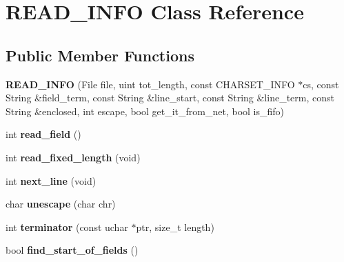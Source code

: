 \hypertarget{classREAD__INFO}{}\section{R\+E\+A\+D\+\_\+\+I\+N\+FO Class Reference}
\label{classREAD__INFO}
\subsection*{Public Member Functions}
\begin{DoxyCompactItemize}
\item 
\mbox{\label{classREAD__INFO_aa0caabe4e1c80794d24a5b05553e6c41}} 
{\bfseries R\+E\+A\+D\+\_\+\+I\+N\+FO} (File file, uint tot\+\_\+length, const C\+H\+A\+R\+S\+E\+T\+\_\+\+I\+N\+FO $\ast$cs, const String \&field\+\_\+term, const String \&line\+\_\+start, const String \&line\+\_\+term, const String \&enclosed, int escape, bool get\+\_\+it\+\_\+from\+\_\+net, bool is\+\_\+fifo)
\item 
\mbox{\label{classREAD__INFO_a0faa1f32582473e54869a49d8c17f079}} 
int {\bfseries read\+\_\+field} ()
\item 
\mbox{\label{classREAD__INFO_ab404e9e75fab6664e0985a0092120850}} 
int {\bfseries read\+\_\+fixed\+\_\+length} (void)
\item 
\mbox{\label{classREAD__INFO_a74a1cf8c13f4884c2ad902402ace46af}} 
int {\bfseries next\+\_\+line} (void)
\item 
\mbox{\label{classREAD__INFO_a4dfcfd7a0ac6455161b94f853ff16145}} 
char {\bfseries unescape} (char chr)
\item 
\mbox{\label{classREAD__INFO_a8c51425b0d4a9e62d9fa3ae80b46298b}} 
int {\bfseries terminator} (const uchar $\ast$ptr, size\+\_\+t length)
\item 
\mbox{\label{classREAD__INFO_a8730dc0bf225edd8275596c411a7f31c}} 
bool {\bfseries find\+\_\+start\+\_\+of\+\_\+fields} ()
\item 
\mbox{\label{classREAD__INFO_a930ce2efb62fc25def1731cbb5acaa50}} 

\end{DoxyCompactItemize}
